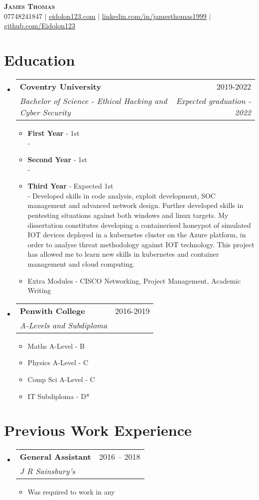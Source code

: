 \documentclass[letterpaper,11pt]{article}
\makeatletter
\newcommand{\resumeItem}[1]{
  \item\small{
    {#1 \vspace{-2pt}}
  }
}
\newcommand{\resumeSubheading}[4]{
  \vspace{-2pt}\item
    \begin{tabular*}{0.97\textwidth}[t]{l@{\extracolsep{\fill}}r}
      \textbf{#1} & #2 \\
      \textit{\small#3} & \textit{\small #4} \\
    \end{tabular*}\vspace{-7pt}
}
\newcommand{\resumeSubHeadingListStart}{\begin{itemize}[leftmargin=0.15in, label={}]}
\newcommand{\resumeSubHeadingListEnd}{\end{itemize}}
\newcommand{\resumeItemListStart}{\begin{itemize}}
\newcommand{\resumeItemListEnd}{\end{itemize}\vspace{-5pt}}
\makeatother
\begin{document}
\linespread{1.3}


\begin{center}
    \textbf{\Huge \scshape James Thomas} \\ \vspace{1pt}
    \small 07748241847 $|$ \href{mailto:x@xcom}{\underline{eidolon123.com}} $|$ 
    \href{https://linkedin.com/in/x}{\underline{linkedin.com/in/jamesthomas1999}} $|$
    \href{https://github.com/x}{\underline{github.com/Eidolon123}}
\end{center}



\section{Education}
  \resumeSubHeadingListStart
    \resumeSubheading
      {Coventry University}{2019-2022}
      {Bachelor of Science - Ethical Hacking and Cyber Security}{Expected graduation - 2022}
          \resumeItemListStart
            \resumeItem{\textbf{First Year} - 1st}\\ 
            - 
            \resumeItem{\textbf{Second Year} - 1st}\\
            - 
            \resumeItem{\textbf{Third Year} - Expected 1st}\\
            - Developed skills in code analysis, exploit development, SOC management and advanced network design.
            Further developed skills in pentesting situations against both windows and linux targets.
            My dissertation constitutes developing a containerised honeypot of simulated IOT devices deployed in a kubernetes cluster on the Azure platform, in order to analyse threat methodology against IOT technology.
            This project has allowed me to learn new skills in kubernetes and container management and cloud computing.
            \resumeItem{Extra Modules - CISCO Networking, Project Management, Academic Writing}
        \resumeItemListEnd
    \resumeSubheading
      {Penwith College}{2016-2019}
      {A-Levels and Subdiploma}{}
          \resumeItemListStart
            \resumeItem{Maths A-Level - B}
            \resumeItem{Physics A-Level - C}
            \resumeItem{Comp Sci A-Level - C}
            \resumeItem{IT Subdiploma - D*}
          \resumeItemListEnd
  \resumeSubHeadingListEnd

\section{Previous Work Experience}
  \resumeSubHeadingListStart
    \resumeSubheading
      {General Assistant}{2016 – 2018}
      {J R Sainsbury's}{}
      \resumeItemListStart
        \resumeItem{Was required to work in any }
      \resumeItemListEnd
    \resumeSubHeadingListEnd
\end{document}
